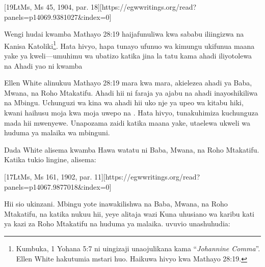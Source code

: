 [19LtMs, Ms 45, 1904, par. 18][https://egwwritings.org/read?panels=p14069.9381027&index=0]


Wengi hudai kwamba Mathayo 28:19 haijafunuliwa kwa sababu iliingizwa na Kanisa Katoliki\footnote{Kumbuka, 1 Yohana 5:7  ni uingizaji unaojulikana kama “\textit{Johannine Comma}”. Ellen White hakutumia mstari huo. Haikuwa hivyo kwa Mathayo 28:19.}. Hata hivyo, hapa tunayo ufunuo wa kimungu ukifunua maana yake ya kweli—umuhimu wa ubatizo katika jina la tatu kama ahadi iliyotolewa na  Ahadi yao ni kwamba 


Ellen White alinukuu Mathayo 28:19 mara kwa mara, akielezea ahadi ya Baba, Mwana, na Roho Mtakatifu. Ahadi hii ni faraja ya ajabu na ahadi inayoshikiliwa na Mbingu. Uchunguzi wa kina wa ahadi hii uko nje ya upeo wa kitabu hiki, kwani haihusu moja kwa moja uwepo na . Hata hivyo, tunakuhimiza kuchunguza mada hii mwenyewe. Unapozama zaidi katika maana yake, utaelewa ukweli wa huduma ya malaika wa mbinguni.


Dada White alisema kwamba  Hawa watatu ni Baba, Mwana, na Roho Mtakatifu. Katika tukio lingine, alisema:


[17LtMs, Ms 161, 1902, par. 11][https://egwwritings.org/read?panels=p14067.9877018&index=0]


Hii sio ukinzani. Mbingu yote inawakilishwa na Baba, Mwana, na Roho Mtakatifu, na katika nukuu hii, yeye alitaja wazi  Kuna uhusiano wa karibu kati ya kazi za Roho Mtakatifu na huduma ya malaika. uvuvio unashuhudia:


